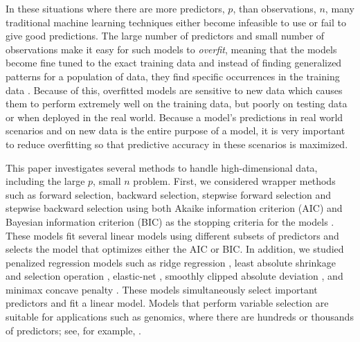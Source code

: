 \documentclass{article}
\begin{document}
	In these situations where there are more predictors, $p$, than observations, $n$, many traditional machine learning techniques either become infeasible to use or fail to give good predictions. The large number of predictors and small number of observations make it easy for such models to \textit{overfit}, meaning that the models become fine tuned to the exact training data and instead of finding generalized patterns for a population of data, they find specific occurrences in the training data \cite{james2013introduction, friedman2001elements}. Because of this, overfitted models are sensitive to new data which causes them to perform extremely well on the training data, but poorly on testing data or when deployed in the real world. Because a model's predictions in real world scenarios and on new data is the entire purpose of a model, it is very important to reduce overfitting so that predictive accuracy in these scenarios is maximized.
	
	
	This paper investigates several methods to handle high-dimensional data, including the large $p$, small $n$ problem. First, we considered wrapper methods such as forward selection, backward selection, stepwise forward selection and stepwise backward selection using both Akaike information criterion (AIC) and Bayesian information criterion (BIC) as the stopping criteria for the models \cite{akaike1998information, schwarz1978estimating}. These models fit several linear models using different subsets of predictors and selects the model that optimizes either the AIC or BIC. In addition, we studied penalized regression models such as ridge regression \cite{hoerl1970ridge}, least absolute shrinkage and selection operation \cite{tibshirani1996regression}, elastic-net \cite{zou2005regularization}, smoothly clipped absolute deviation \cite{fan2001variable}, and minimax concave penalty \cite{zhang2010nearly}. These models simultaneously select important predictors and fit a linear model. Models that perform variable selection are suitable for applications such as genomics, where there are hundreds or thousands of predictors; see, for example, \cite{usai2009lasso, li2012overview}.
	
\end{document}
